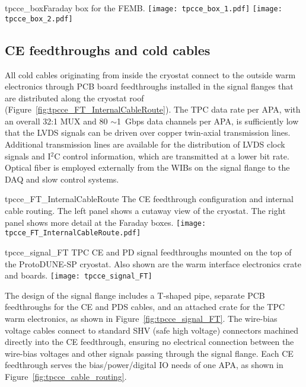 \begin{cdrfigure}{tpcce_box}{Faraday box for the FEMB.}
\texttt{[image: tpcce\_box\_1.pdf]}
\texttt{[image: tpcce\_box\_2.pdf]}
\end{cdrfigure}

%
\subsection{CE feedthroughs and cold cables}
\label{subsec:ce_feedthrough}

All cold cables originating from inside the cryostat connect to the outside warm electronics through PCB board feedthroughs
installed in the signal flanges that are distributed along the cryostat roof (Figure~\ref{fig:tpcce_FT_InternalCableRoute}).
The TPC data rate per APA, with an overall 32:1 MUX and 80 $\sim$1~Gbps data channels per APA,
is sufficiently low that the LVDS signals can be driven over copper twin-axial transmission lines.
Additional transmission lines are available for the distribution of LVDS clock signals and I$^2$C control information,
which are transmitted at a lower bit rate.
Optical fiber is employed externally from the WIBs on the signal flange to the DAQ and slow control systems.

\begin{cdrfigure}{tpcce_FT_InternalCableRoute}{
The CE feedthrough configuration and internal cable routing. The left panel shows a cutaway view of the cryostat.
The right panel shows more detail at the Faraday boxes.}
\texttt{[image: tpcce\_FT\_InternalCableRoute.pdf]}
\end{cdrfigure}


\begin{cdrfigure}{tpcce_signal_FT}{
TPC CE and PD signal feedthroughs mounted on the top of the ProtoDUNE-SP cryostat. Also shown are the warm interface electronics crate and boards.}
\texttt{[image: tpcce\_signal\_FT]}
\end{cdrfigure}

The design of the signal flange includes a T-shaped pipe, separate PCB feedthroughs for the CE and PDS cables, and
an attached crate for the TPC warm electronics, as shown in Figure~\ref{fig:tpcce_signal_FT}.
The wire-bias voltage cables connect to standard SHV (safe high voltage) connectors machined directly into the CE feedthrough,
ensuring no electrical connection between the wire-bias voltages and other signals passing through the signal flange.
Each CE feedthrough serves the bias/power/digital IO needs of one APA, as shown 
in Figure~\ref{fig:tpcce_cable_routing}.  

